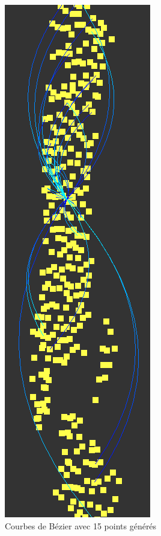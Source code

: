 \documentclass[12pt]{article}
\begin{document}
		\begin{figure}[!h]
		\begin{center}
		\includegraphics[scale=.60]{15_generated_points.png}
		\caption{Courbes de Bézier avec 15 points générés}
		\end{center}
		\end{figure}
		
\end{document}
